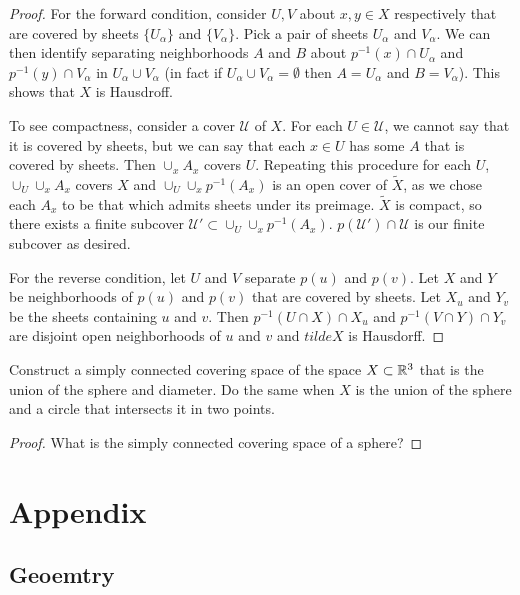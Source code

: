 \documentclass[10pt]{article}
\begin{document}
\begin{proof}

	For the forward condition, consider $U, V$ about $x, y \in X$ respectively
	that are covered by sheets $\{U_{\alpha}\}$ and $\{V_{\alpha}\}$. Pick a pair of sheets
	$U_{\alpha}$ and $V_{\alpha}$. We can then identify separating neighborhoods
	$A$ and $B$ about $p^{-1}(x) \cap U_{\alpha}$ and $p^{-1}(y) \cap V_{\alpha}$
	in $U_{\alpha} \cup V_{\alpha}$ (in fact if $U_{\alpha} \cup V_{\alpha} =
	\emptyset$ then $A = U_{\alpha}$ and $B = V_{\alpha}$). This shows that $X$
	is Hausdroff.

	To see compactness, consider a cover $\mathcal{U}$ of $X$. For each $U \in
	\mathcal{U}$, we cannot say that it is covered by sheets, but we can say that
	each $x \in U$ has some $A$ that is covered by sheets. Then $\cup_x A_x$
	covers $U$. Repeating this procedure for each $U$, $\cup_U \cup_x A_x$ covers $X$ and $\cup_U \cup_x p^{-1}(A_x)$ is an open cover of $\tilde{X}$, as we chose each $A_x$ to be that which admits sheets under its preimage. $\tilde{X}$ is compact, so there exists a finite subcover $\mathcal{U'} \subset \cup_U \cup_x
	p^{-1}(A_x)$. $p(\mathcal{U'}) \cap \mathcal{U}$ is our finite subcover as
	desired.

	For the reverse condition, let $U$ and $V$ separate $p(u)$ and $p(v)$. Let
	$X$ and $Y$ be neighborhoods of $p(u)$ and $p(v)$ that are covered by sheets.
	Let $X_u$ and $Y_v$ be the sheets containing $u$ and $v$. Then $p^{-1}(U \cap
	X) \cap X_u$ and $p^{-1}(V \cap Y) \cap Y_v$ are disjoint open neighborhoods
	of $u$ and $v$ and $tilde{X}$ is Hausdorff.

\end{proof}

\begin{exercise}[1.3.4]
	Construct a simply connected covering space of the space $X \subset \mathbb{R}^3$ that is the union of
	the sphere and diameter. Do the same when $X$ is the union of the sphere and
	a circle that intersects it in two points.
\end{exercise}

\begin{proof}
	What is the simply connected covering space of a sphere?
\end{proof}

\section{Appendix}

\subsection{Geoemtry}
\end{document}
